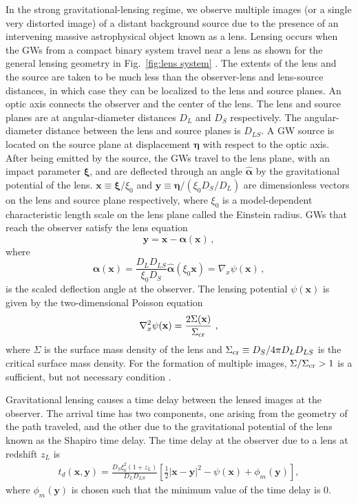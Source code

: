 \documentclass[floats,floatfix,showpacs,amssymb,prd,twocolumn,superscriptaddress,nofootinbib,nolongbibliography,reprint]{revtex4-2}
\renewcommand{\vec}[1]{\mathbf{#1}}
\begin{document}
In the strong gravitational-lensing regime, we observe multiple images (or a single very distorted image) of a distant background source due to the presence of an intervening massive astrophysical object known as a lens. Lensing occurs when the GWs from a compact binary system travel near a lens as shown for the general lensing geometry in Fig.~\ref{fig:lens system} \cite{1992grle.book.....S}. The extents of the lens and the source are taken to be much less than the observer-lens and lens-source distances, in which case they can be localized to the lens and source planes. An optic axis connects the observer and the center of the lens. The lens and source planes are at angular-diameter distances $D_L$ and $D_S$ respectively. The angular-diameter distance between the lens and source planes is $D_{LS}$. A GW source is located on the source plane at displacement $\boldsymbol{\eta}$ with respect to the optic axis. After being emitted by the source, the GWs travel to the lens plane, with an impact parameter $\boldsymbol{\xi}$, and are deflected through an angle $\hat{\boldsymbol{\alpha}}$ by the gravitational potential of the lens. $\vec{x} \equiv \boldsymbol{\xi} / \xi_0$ and $\vec{y} \equiv \boldsymbol{\eta}/ (\xi_0 D_S / D_L)$ are dimensionless vectors on the lens and source plane respectively, where $\xi_0$ is a model-dependent characteristic length scale on the lens plane called the Einstein radius. GWs that reach the observer satisfy the lens equation
\begin{equation} \label{eq:lens equation}
\vec{y} = \vec{x} -\boldsymbol{\alpha}(\vec{x})\,,
\end{equation}
where
\begin{equation}
\boldsymbol{\alpha}(\vec{x}) = \frac{D_L D_{LS}}{\xi_0 D_S} \boldsymbol{\hat{\alpha}}(\xi_0 \vec{x}) = \nabla_x \psi(\vec{x}) \,,
\end{equation}
is the scaled deflection angle at the observer. The lensing potential $\psi(\vec{x})$ is given by the two-dimensional Poisson equation
\begin{equation} \label{E:Poisson}
\nabla_x^2 \psi(\vec{x}) = \frac{2\Sigma(\vec{x})}{\Sigma_{\rm cr}}~,
\end{equation}
where $\Sigma$ is the surface mass density of the lens and $\Sigma_{\rm cr} \equiv D_S/4\pi D_LD_{LS}$ is the critical surface mass density. For the formation of multiple images, $\Sigma/\Sigma_{\rm cr} > 1$ is a sufficient, but not necessary condition \cite{1986MNRAS.219..333S}. 

Gravitational lensing causes a time delay between the lensed images at the observer. The arrival time has two components, one arising from the geometry of the path traveled, and the other due to the gravitational potential of the lens known as the Shapiro time delay. The time delay at the observer due to a lens at redshift $z_L$ is
\begin{align}\label{eq:time delay}
    t_d(\vec{x}, \vec{y}) = \frac{D_S \xi^2_0 (1 + z_L) }{D_L D_{LS}}\left[ \frac{1}{2} |\vec{x} - \vec{y}|^2 - \psi(\vec{x}) + \phi_m(\vec{y}) \right],
\end{align}
where $\phi_m(\vec{y})$ is chosen such that the minimum value of the time delay is 0.
\end{document}
